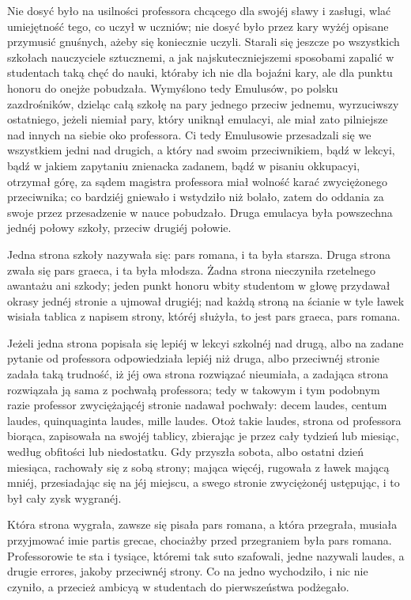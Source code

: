 \documentclass{book}
\begin{document}
Nie dosyć było na usilności professora chcącego dla swojéj sławy i zasługi, wlać umiejętność tego, co uczył w uczniów; nie dosyć było przez kary wyżéj opisane przymusić gnuśnych, ażeby się koniecznie uczyli. Starali się jeszcze po wszystkich szkołach nauczyciele sztucznemi, a jak najskuteczniejszemi sposobami zapalić w studentach taką chęć do nauki, któraby ich nie dla bojaźni kary, ale dla punktu honoru do onejże pobudzała. Wymyślono tedy Emulusów, po polsku zazdrośników, dzieląc całą szkołę na pary jednego przeciw jednemu, wyrzuciwszy ostatniego, jeżeli niemiał pary, który uniknął emulacyi, ale miał zato pilniejsze nad innych na siebie oko professora. Ci tedy Emulusowie przesadzali się we wszystkiem jedni nad drugich, a który nad swoim przeciwnikiem, bądź w lekcyi, bądź w jakiem zapytaniu znienacka zadanem, bądź w pisaniu okkupacyi, otrzymał górę, za sądem magistra professora miał wolność karać zwyciężonego przeciwnika; co bardziéj gniewało i wstydziło niż bolało, zatem do oddania za swoje przez przesadzenie w nauce pobudzało. Druga emulacya była powszechna jednéj połowy szkoły, przeciw drugiéj połowie.

Jedna strona szkoły nazywała się: pars romana, i ta była starsza. Druga strona zwała się pars graeca, i ta była młodsza. Żadna strona nieczyniła rzetelnego awantażu ani szkody; jeden punkt honoru wbity studentom w głowę przydawał okrasy jednéj stronie a ujmował drugiéj; nad każdą stroną na ścianie w tyle ławek wisiała tablica z napisem strony, któréj służyła, to jest pars graeca, pars romana.

Jeżeli jedna strona popisała się lepiéj w lekcyi szkolnéj nad drugą, albo na zadane pytanie od professora odpowiedziała lepiéj niż druga, albo przeciwnéj stronie zadała taką trudność, iż jéj owa strona rozwiązać nieumiała, a zadająca strona rozwiązała ją sama z pochwałą professora; tedy w takowym i tym podobnym razie professor zwyciężającéj stronie nadawał pochwały: decem laudes, centum laudes, quinquaginta laudes, mille laudes. Otoż takie laudes, strona od professora biorąca, zapisowała na swojéj tablicy, zbierając je przez cały tydzień lub miesiąc, według obfitości lub niedostatku. Gdy przyszła sobota, albo ostatni dzień miesiąca, rachowały się z sobą strony; mająca więcéj, rugowała z ławek mającą mniéj, przesiadając się na jéj miejscu, a swego stronie zwyciężonéj ustępując, i to był cały zysk wygranéj.

Która strona wygrała, zawsze się pisała pars romana, a która przegrała, musiała przyjmować imie partis grecae, chociażby przed przegraniem była pars romana. Professorowie te sta i tysiące, któremi tak suto szafowali, jedne nazywali laudes, a drugie errores, jakoby przeciwnéj strony. Co na jedno wychodziło, i nic nie czyniło, a przecież ambicyą w studentach do pierwszeństwa podżegało.
\end{document}
